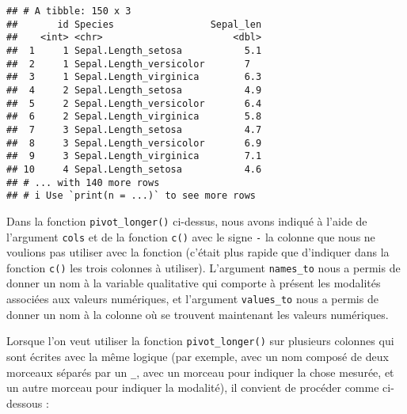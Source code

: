 \documentclass[
  french,
]{book}
\newenvironment{Shaded}{\begin{snugshade}}{\end{snugshade}}
\newcommand{\DataTypeTok}[1]{\textcolor[rgb]{0.13,0.29,0.53}{#1}}
\newcommand{\KeywordTok}[1]{\textcolor[rgb]{0.13,0.29,0.53}{\textbf{#1}}}
\newcommand{\NormalTok}[1]{#1}
\newcommand{\OperatorTok}[1]{\textcolor[rgb]{0.81,0.36,0.00}{\textbf{#1}}}
\newcommand{\StringTok}[1]{\textcolor[rgb]{0.31,0.60,0.02}{#1}}
\begin{document}
\begin{Shaded}
\end{Shaded}

\begin{verbatim}
## # A tibble: 150 x 3
##       id Species                 Sepal_len
##    <int> <chr>                       <dbl>
##  1     1 Sepal.Length_setosa           5.1
##  2     1 Sepal.Length_versicolor       7  
##  3     1 Sepal.Length_virginica        6.3
##  4     2 Sepal.Length_setosa           4.9
##  5     2 Sepal.Length_versicolor       6.4
##  6     2 Sepal.Length_virginica        5.8
##  7     3 Sepal.Length_setosa           4.7
##  8     3 Sepal.Length_versicolor       6.9
##  9     3 Sepal.Length_virginica        7.1
## 10     4 Sepal.Length_setosa           4.6
## # ... with 140 more rows
## # i Use `print(n = ...)` to see more rows
\end{verbatim}

Dans la fonction \texttt{pivot\_longer()} ci-dessus, nous avons indiqué à l'aide de l'argument \texttt{cols} et de la fonction \texttt{c()} avec le signe \texttt{-} la colonne que nous ne voulions pas utiliser avec la fonction (c'était plus rapide que d'indiquer dans la fonction \texttt{c()} les trois colonnes à utiliser). L'argument \texttt{names\_to} nous a permis de donner un nom à la variable qualitative qui comporte à présent les modalités associées aux valeurs numériques, et l'argument \texttt{values\_to} nous a permis de donner un nom à la colonne où se trouvent maintenant les valeurs numériques.

Lorsque l'on veut utiliser la fonction \texttt{pivot\_longer()} sur plusieurs colonnes qui sont écrites avec la même logique (par exemple, avec un nom composé de deux morceaux séparés par un \texttt{\_}, avec un morceau pour indiquer la chose mesurée, et un autre morceau pour indiquer la modalité), il convient de procéder comme ci-dessous :
\end{document}
